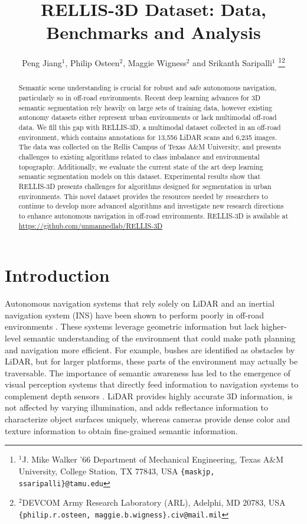 \documentclass[letterpaper, 10 pt, conference]{ieeeconf}
\title{\LARGE \bf
RELLIS-3D Dataset: Data, Benchmarks and Analysis
}
\author{Peng Jiang$^{1}$, Philip Osteen$^{2}$, Maggie Wigness$^{2}$ and Srikanth Saripalli$^{1}$
\thanks{$^{1}$J. Mike Walker '66 Department of Mechanical Engineering, 
Texas A\&M University, College Station, TX 77843, USA
        {\tt\small \{maskjp, ssaripalli\}@tamu.edu}}\thanks{$^{2}$DEVCOM Army Research Laboratory (ARL), Adelphi, MD 20783, USA
        {\tt\small \{philip.r.osteen, maggie.b.wigness\}.civ@mail.mil}}}
\begin{document}
\maketitle
\thispagestyle{empty}
\pagestyle{empty}


\begin{abstract}
Semantic scene understanding is crucial for robust and safe autonomous navigation, particularly so in off-road environments. Recent deep learning advances for 3D semantic segmentation rely heavily on large sets of training data, however existing autonomy datasets either represent urban environments or lack multimodal off-road data. We fill this gap with RELLIS-3D, a multimodal dataset collected in an off-road environment, which contains annotations for 13,556 LiDAR scans and 6,235 images. The data was collected on the Rellis Campus of Texas A\&M University, and presents challenges to existing algorithms related to class imbalance and environmental topography. Additionally, we evaluate the current state of the art deep learning semantic segmentation models on this dataset. Experimental results show that RELLIS-3D presents challenges for algorithms designed for segmentation in urban environments. This novel dataset provides the resources needed by researchers to continue to develop more advanced algorithms and investigate new research directions to enhance autonomous navigation in off-road environments. RELLIS-3D is available at \url{https://github.com/unmannedlab/RELLIS-3D}
\end{abstract} 

\section{Introduction}
Autonomous navigation systems that rely solely on LiDAR and an inertial navigation system (INS) have been shown to perform poorly in off-road environments \cite{Maturana2018, Jackel2006, Thrun2006}. These systems leverage geometric information but lack higher-level semantic understanding of the environment that could make path planning and navigation more efficient. For example, bushes are identified as obstacles by LiDAR, but for larger platforms, these parts of the environment may actually be traversable. The importance of semantic awareness has led to the emergence of visual perception systems that directly feed information to navigation systems to complement depth sensors \cite{Maturana2018, Hussein2016, Huertas2005, Manduchi2005, Yang2020}. LiDAR provides highly accurate 3D information, is not affected by varying illumination, and adds reflectance information to characterize object surfaces uniquely, whereas cameras provide dense color and texture information to obtain fine-grained semantic information.
\end{document}
